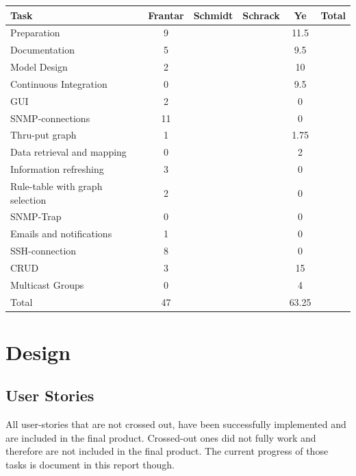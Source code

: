 \documentclass[11pt, a4paper]{article}
\begin{document}
\begin{tabular} {| l | c | c | c | c | c |} \hline

	Task 								& 	Frantar 	& 	Schmidt 	& 	Schrack 	& 	Ye 		& 	Total 	\\ \hline \hline
	
	Preparation							& 	9			&				&				&	11.5	&			\\ \hline
	Documentation						&	5			&				&				&	9.5		&			\\ \hline
	Model Design						& 	2			&				&				& 	10		&			\\ \hline
	Continuous Integration				& 	0			& 				& 				&	9.5		&			\\ \hline \hline
		
	GUI									& 	2			&				&				& 	0		&			\\ \hline
	SNMP-connections					& 	11			&				&				& 	0		&			\\ \hline
	Thru-put graph						& 	1			&				&				& 	1.75	&			\\ \hline
	Data retrieval and mapping			& 	0			&				&				& 	2		&			\\ \hline
	Information refreshing				&	3			&				&				&	0		&			\\ \hline
	Rule-table with graph selection		&	2			&				&				&	0		&			\\ \hline \hline
	
	SNMP-Trap							&	0			&				&				&	0		&			\\ \hline
	Emails and notifications			&	1			&				&				&	0		&			\\ \hline
	SSH-connection						&	8			&				&				&	0		&			\\ \hline
	CRUD								& 	3			& 				& 				&	15		&			\\ \hline
	Multicast Groups					&	0			&				&				&	4		&			\\ \hline \hline
	
	Total								&	47			&				&				&	63.25	&			\\ \hline
	
\end{tabular}

\newpage

\section{Design}
\subsection{User Stories}
All user-stories that are not crossed out, have been successfully implemented and are included in the final product. Crossed-out ones did not fully work and therefore are not included in the final product. The current progress of those tasks is document in this report though.
\end{document}
